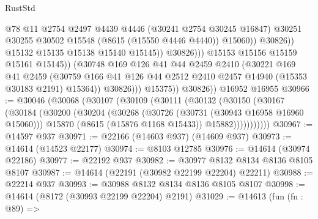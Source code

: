 \begin{lexlean}{RustStd}
\begin{coremodule}
                                      @78
                                      @11
                                      @2754
                                      @2497
                                      @4439
                                      @4446
                                      (@30241 @2754 @30245 @16847)
                                      @30251
                                      @30255
                                      @30502
                                      @15548
                                      (@8615 (@15550 @4446 @4440))
                                      @15060))
                                  @30826))
                              @15132
                              @15135
                              @15138
                              @15140
                              @15145))
                          @30826)))
                    @15153
                    @15156
                    @15159
                    @15161
                    @15145))
                (@30748
                  @169
                  @126
                  @41
                  @44
                  @2459
                  @2410
                  (@30221
                    @169
                    @41
                    @2459
                    (@30759
                      @166
                      @41
                      @126
                      @44
                      @2512
                      @2410
                      @2457
                      @14940
                      (@15353 @30183 @2191)
                      @15364))
                  @30826)))
            @15375))
        @30826))
    @16952
    @16955
@30966 := @30046
    (@30068
      (@30107
        (@30109
          (@30111
            (@30132
              (@30150
                (@30167
                  (@30184
                    (@30200
                      (@30204
                        (@30268
                          (@30726 (@30731 (@30943 @16958 @16960 @15060)))
                          @15870
                          (@8615 (@15876 @1168 @15433))
                          @15882)))))))))))
@30967 := @14597 @937
@30971 := @22166 (@14603 @937) (@14609 @937)
@30973 := @14614 (@14523 @22177)
@30974 := @8103 @12785
@30976 := @14614 (@30974 @22186)
@30977 := @22192 @937
@30982 := @30977 @8132 @8134 @8136 @8105 @8107
@30987 := @14614 (@22191 (@30982 @22199 @22204) @22211)
@30988 := @22214 @937
@30993 := @30988 @8132 @8134 @8136 @8105 @8107
@30998 := @14614 (@8172 (@30993 @22199 @22204) @2191)
@31029 := @14613
    (fun (fn : @89) =>

\end{coremodule}
\end{lexlean}
